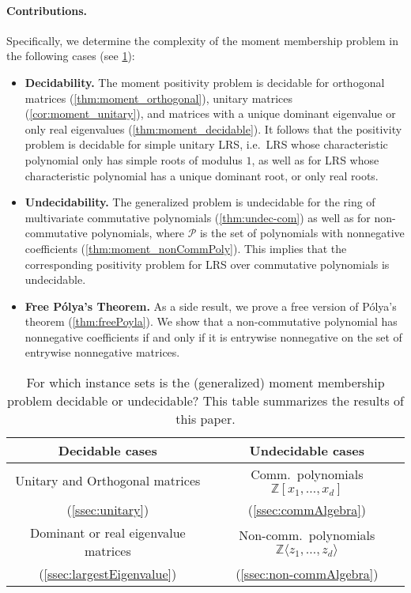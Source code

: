 \paragraph{Contributions.} Specifically, we determine the complexity of the moment membership problem in the following cases (see \cref{tab:contributions}):
\begin{itemize}
	\item \textbf{Decidability.} The moment positivity problem is decidable for orthogonal matrices (\cref{thm:moment_orthogonal}),  unitary matrices (\cref{cor:moment_unitary}), and matrices with a unique dominant eigenvalue or only real eigenvalues (\cref{thm:moment_decidable}).
	It follows that the positivity problem is decidable for simple unitary LRS, i.e.\ LRS whose characteristic polynomial only has simple  roots of modulus $1$,  
	as well as for LRS whose characteristic polynomial has a unique dominant root, or only real roots. 
	\item \textbf{Undecidability.} The generalized problem is undecidable for the ring of multivariate commutative polynomials (\cref{thm:undec-com}) as well as for non-commutative polynomials, where $\mathcal P$ is the set of polynomials with nonnegative coefficients (\cref{thm:moment_nonCommPoly}). 
	This implies that the corresponding positivity problem for LRS over commutative polynomials is undecidable.
	\item \textbf{Free P\'olya's Theorem.} As a side result, we prove a free version of P\'olya's theorem (\cref{thm:freePoyla}). We show that a non-commutative polynomial has nonnegative coefficients if and only if it is entrywise nonnegative on the set of entrywise nonnegative matrices.  
\end{itemize}

\renewcommand{\arraystretch}{1.2}

\begin{table}
\centering
\begin{tabular}{|c | c |}
\hline
\textbf{Decidable cases} & \textbf{Undecidable cases}\\
\hline
Unitary and Orthogonal matrices & Comm.\ polynomials $\mathbb{Z}[x_1, \ldots, x_d]$\\
(\cref{ssec:unitary}) & (\cref{ssec:commAlgebra}) \\
\hline
Dominant or real eigenvalue matrices & Non-comm.\ polynomials $\mathbb{Z}\langle z_1, \ldots, z_d \rangle$\\
(\cref{ssec:largestEigenvalue}) & (\cref{ssec:non-commAlgebra}) \\
\hline
\end{tabular}
\caption{For which instance sets is the (generalized) moment membership problem decidable or undecidable? This table summarizes the results of this paper.}
\label{tab:contributions}
\end{table}

